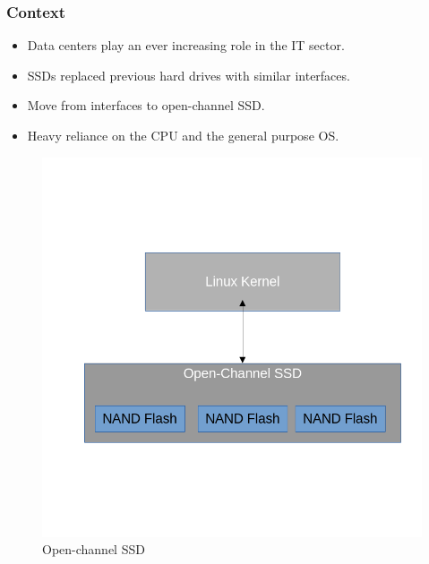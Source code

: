 \begin{frame}[hoved]
	\frametitle{Context}
	\begin{minipage}[t]{0.45\textwidth}
		\begin{itemize}
			\item Data centers play an ever increasing role in the IT sector.
			\item SSDs replaced previous hard drives with similar interfaces.
			\item Move from interfaces to open-channel SSD.
			\item Heavy reliance on the CPU and the general purpose OS.
		\end{itemize}
	\end{minipage}
	\hfill
	\begin{minipage}[t]{0.45\textwidth}
		\begin{figure}
			\begin{center}
				\includegraphics[width=0.55\textheight]{figures/openssd.png}
			\end{center}
			\caption{Open-channel SSD}\label{fig:openssd}
		\end{figure}
	\end{minipage}
\end{frame}

